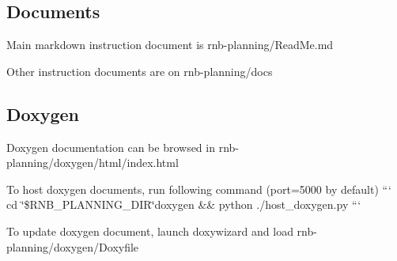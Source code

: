 \subsection*{Documents}


\begin{DoxyItemize}
\item Main markdown instruction document is rnb-\/planning/\+Read\+Me.\+md
\item Other instruction documents are on rnb-\/planning/docs
\end{DoxyItemize}

\subsection*{Doxygen}


\begin{DoxyItemize}
\item Doxygen documentation can be browsed in rnb-\/planning/doxygen/html/index.\+html
\item To host doxygen documents, run following command (port=5000 by default) ``` cd \char`\"{}\$\+R\+N\+B\+\_\+\+P\+L\+A\+N\+N\+I\+N\+G\+\_\+\+D\+I\+R\char`\"{}doxygen \&\& python ./host\+\_\+doxygen.py ```
\item To update doxygen document, launch doxywizard and load rnb-\/planning/doxygen/\+Doxyfile 
\end{DoxyItemize}